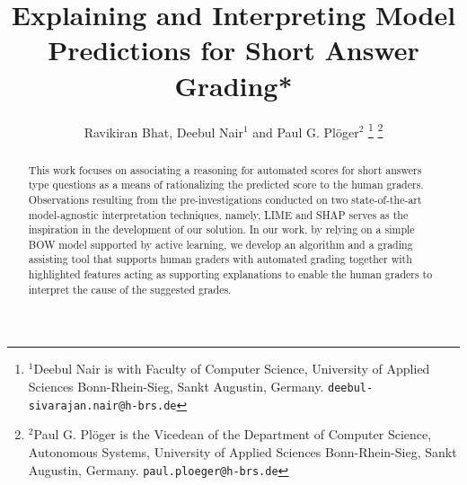 \documentclass[letterpaper, 10 pt, conference]{ieeeconf}  %
\title{\LARGE \bf
Explaining and Interpreting Model Predictions for Short Answer Grading*
}
\author{Ravikiran Bhat, Deebul Nair$^{1}$ and Paul G. Pl{\"o}ger$^{2}$%
\thanks{$^{1}$Deebul Nair is with Faculty of Computer Science,
        University of Applied Sciences Bonn-Rhein-Sieg, Sankt Augustin, Germany.
        {\tt\small deebul-sivarajan.nair@h-brs.de}}%
\thanks{$^{2}$Paul G. Pl{\"o}ger is the Vicedean of the Department of Computer Science, Autonomous Systems, University of Applied Sciences Bonn-Rhein-Sieg, Sankt Augustin, Germany.
        {\tt\small paul.ploeger@h-brs.de}}%
}
\begin{document}
\maketitle
\thispagestyle{empty}
\pagestyle{empty}


\begin{abstract}

This work focuses on associating a reasoning for automated scores for short answers type questions as a means of rationalizing the predicted score to the human graders. Observations resulting from the pre-investigations conducted on two state-of-the-art model-agnostic interpretation techniques, namely, LIME and SHAP serves as the inspiration in the development of our solution. In our work, by relying on a simple BOW model supported by active learning, we develop an algorithm and a grading assisting tool that supports human graders with automated grading together with highlighted features acting as supporting explanations to enable the human graders to interpret the cause of the suggested grades. 

\end{abstract}


\end{document}
